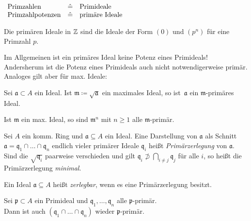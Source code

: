 \documentclass{cheat-sheet}
\newcommand{\aaa}{\mathfrak{a}}
\newcommand{\ppp}{\mathfrak{p}}
\newcommand{\qqq}{\mathfrak{q}}
\newcommand{\mmm}{\mathfrak{m}}
\begin{document}
\begin{bem}
  $\begin{array}[t]{l c l}
    \text{Primzahlen} & \hat{=} & \text{Primideale} \\
    \text{Primzahlpotenzen} & \hat{=} & \text{primäre Ideale} \\
  \end{array}$
\end{bem}

\begin{bsp}
  Die primären Ideale in $\mathbb{Z}$ sind die Ideale der Form $(0)$ und $(p^n)$ für eine Primzahl $p$.
\end{bsp}

\begin{acht}
  Im Allgemeinen ist ein primäres Ideal keine Potenz eines Primideals!
  Andersherum ist die Potenz eines Primideals auch nicht notwendigerweise primär.
  Analoges gilt aber für max. Ideale:
\end{acht}

\begin{prop}
  Sei $\aaa \subset A$ ein Ideal.
  Ist $\mmm \coloneqq \sqrt{\aaa}$ ein maximales Ideal, so ist~$\aaa$ ein $\mmm$-primäres Ideal.
\end{prop}

\begin{kor}
  Ist $\mmm$ ein max. Ideal, so sind $\mmm^n$ mit $n \geq 1$ alle $\mmm$-primär.
\end{kor}

\begin{defn}
  Sei $A$ ein komm. Ring und $\aaa \subseteq A$ ein Ideal.
  Eine Darstellung von $\aaa$ als Schnitt $\aaa = \qqq_1 \cap \ldots \cap \qqq_n$ endlich vieler primärer Ideale $\qqq_i$ heißt \emph{Primärzerlegung} von $\aaa$.
  Sind die $\sqrt{\qqq_i}$ paarweise verschieden und gilt $\qqq_i \not\supset \bigcap_{i \neq j} \qqq_j$ für alle $i$, so heißt die Primärzerlegung \emph{minimal}.
\end{defn}

\begin{defn}
  Ein Ideal $\aaa \subseteq A$ heißt \emph{zerlegbar}, wenn es eine Primärzerlegung besitzt.
\end{defn}


\begin{lem}
  Sei $\ppp \subset A$ ein Primideal und $\qqq_1, \ldots, \qqq_n$ alle $\ppp$-primär. \\
  Dann ist auch $(\qqq_1 \cap \ldots \cap \qqq_n)$ wieder $\ppp$-primär.
\end{lem}
\end{document}
